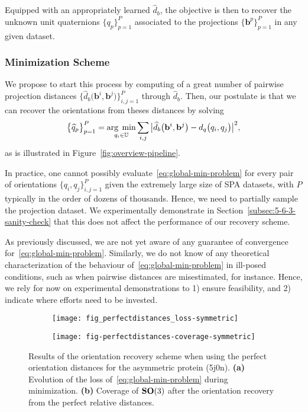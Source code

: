 Equipped with an appropriately learned $\widehat{d}_b$, the objective is then to recover the unknown unit quaternions $\big\{q_p\big\}_{p=1}^P$ associated to the projections $\big\{\mathbf{b}^p\big\}_{p=1}^P$ in any given dataset.

\subsubsection{Minimization Scheme}

We propose to start this process by computing of a great number of pairwise projection distances $\big\{\widehat{d}_b\big(\mathbf{b}^i,\mathbf{b}^j\big)\big\}_{i,j=1}^{P}$ through $\widehat{d}_b$. Then, our postulate is that we can recover the orientations from theses distances by solving
\begin{equation}
    \label{eq:global-min-problem}
    \big\{\widehat{q}_p\big\}_{p=1}^P=\underset{q_i\in\mathbb{U}}{\arg\;\min}\sum_{i,j} \big|\widehat{d}_b\big(\mathbf{b}^i,\mathbf{b}^j\big) - d_q\big(q_i,q_j\big) \big|^2,
\end{equation}
as is illustrated in Figure~\ref{fig:overview-pipeline}.

In practice, one cannot possibly evaluate~\eqref{eq:global-min-problem} for every pair of orientations $\big\{q_i,q_j\big\}_{i,j=1}^P$ given the extremely large size of SPA datasets, with $P$ typically in the order of dozens of thousands. Hence, we need to partially sample the projection dataset. We experimentally demonstrate in Section~\ref{subsec:5-6-3-sanity-check} that this does not affect the performance of our recovery scheme.

As previously discussed, we are not yet aware of any guarantee of convergence for~\eqref{eq:global-min-problem}. Similarly, we do not know of any theoretical characterization of the behaviour of~\eqref{eq:global-min-problem} in ill-posed conditions, such as when pairwise distances are misestimated, for instance. Hence, we rely for now on experimental demonstrations to 1) ensure feasibility, and 2) indicate where efforts need to be invested.

\begin{figure}
    \centering
    \begin{subfigure}[b]{0.48\textwidth}
        \texttt{[image: fig\_perfectdistances\_loss-symmetric]}
        \caption{}
    \end{subfigure} \quad
    \begin{subfigure}[b]{0.48\textwidth}
    \centering
        \texttt{[image: fig-perfectdistances-coverage-symmetric]}
        \caption{}
    \end{subfigure}
    \caption{Results of the orientation recovery scheme when using the perfect orientation distances for the asymmetric protein (5j0n). \textbf{(a)} Evolution of the loss of~\eqref{eq:global-min-problem} during minimization. \textbf{(b)} Coverage of $\mathrm{\mathbf{SO}}(3)$ after the orientation recovery from the perfect relative distances. }
    \label{fig:minim-loss-perfect-distances}
\end{figure}
